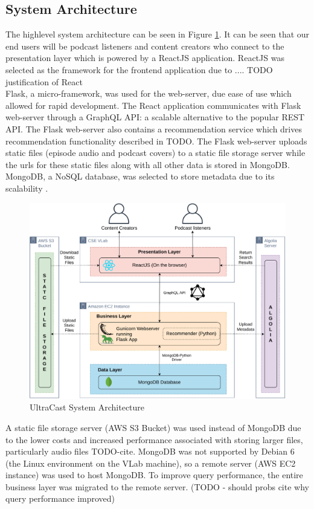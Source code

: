 \documentclass[../report.tex]{subfiles}
\begin{document}
\newpage

\subsection{System Architecture}

The highlevel system architecture can be seen in Figure \ref{fig:system_architecture}.
It can be seen that our end users will be podcast listeners and content creators who
connect to the presentation layer which is powered by a ReactJS application. ReactJS was selected as
the framework for the frontend application due to .... TODO justification of React\\

Flask, a micro-framework, \cite{flask} was used for the web-server, due ease of use which allowed
for rapid development. The React application communicates with Flask web-server through a GraphQL API: 
a scalable alternative to the popular REST API\cite{graphql}. The Flask web-server also contains a
recommendation service which drives recommendation functionality described in TODO. The Flask
web-server uploads static files (episode audio and podcast covers) to a static file storage server while
the urls for these static files along with all other data is stored in MongoDB. MongoDB, a NoSQL database, 
was selected to store metadata due to its scalability \cite{MongoDB2020}.

\begin{figure}[ht] 
    \centering
    \includegraphics[width=16cm]{resources/SystemArchitecture}
    \caption{UltraCast System Architecture}
    \label{fig:system_architecture} 
\end{figure}

A static file storage server (AWS S3 Bucket) was used instead of MongoDB due to the lower costs 
and increased performance associated with storing larger files, particularly audio files TODO-cite.
MongoDB was not supported by Debian 6 (the Linux environment on the VLab machine), so a remote server
(AWS EC2 instance) was used to host MongoDB. To improve query performance, the entire business layer
was migrated to the remote server. (TODO - should probs cite why query performance improved)
\end{document}
